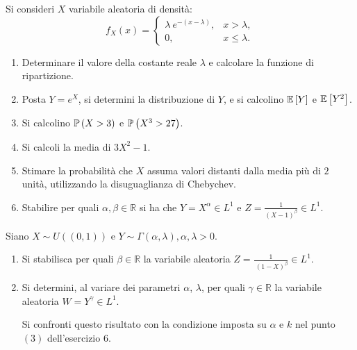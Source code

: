 Si consideri $X$ variabile aleatoria di densità:
\begin{equation*}
f_{X}\left(x\right) =\begin{cases}
\lambda \ e^{-\left(x-\lambda \right)} , & x >\lambda ,\\
0, & x\leq \lambda .
\end{cases}
\end{equation*}
\begin{enumerate}
\item Determinare il valore della costante reale $\lambda $ e calcolare la funzione di ripartizione.
\item Posta $Y=e^{X}$, si determini la distribuzione di $Y$, e si calcolino $\mathbb{E}\left[Y\right]$ e $\mathbb{E}\left[Y^{2}\right]$.
\item Si calcolino $\mathbb{P}\left(X >3\right)$ e $\mathbb{P}\left(X^{3}  >27\right)$.
\item Si calcoli la media di $3X^{2} -1$.
\item Stimare la probabilità che $X$ assuma valori distanti dalla media più di $2$ unità, utilizzando la disuguaglianza di Chebychev.
\item Stabilire per quali $\alpha ,\beta \in \mathbb{R}$ si ha che $Y=X^{\alpha } \in L^{1}$ e $Z=\frac{1}{\left(X-1\right)^{\beta }} \in L^{1}$.
\end{enumerate}
\Esercizio{}

Siano $X\sim U\left(\left(0,1\right)\right)$ e $Y\sim \Gamma \left(\alpha ,\lambda \right) ,\alpha ,\lambda  >0$.
\begin{enumerate}
\item Si stabilisca per quali $\beta \in \mathbb{R}$ la variabile aleatoria $Z=\frac{1}{\ \left(1-X\right)^{\beta }} \in L^{1}$.
\item Si determini, al variare dei parametri $\alpha $, $\lambda $, per quali $\gamma \in \mathbb{R}$ la variabile aleatoria $W=Y^{\gamma } \in L^{1}$.

Si confronti questo risultato con la condizione imposta su $\alpha $ e $k$ nel punto $\left(3\right)$ dell'esercizio $6$.
\end{enumerate}
\Esercizio{}

